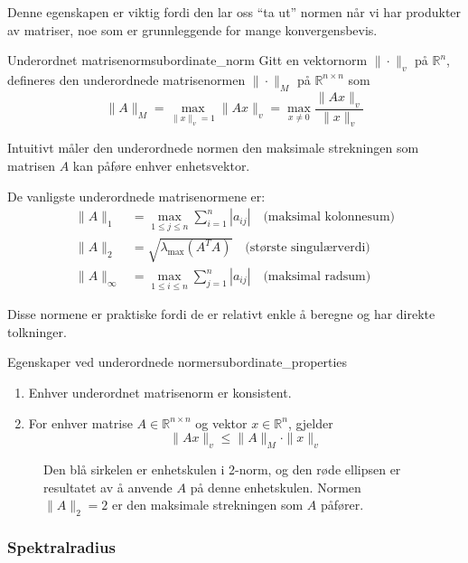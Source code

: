 Denne egenskapen er viktig fordi den lar oss \enquote{ta ut} normen når vi har produkter av matriser, noe som er grunnleggende for mange konvergensbevis.

\begin{definition}{Underordnet matrisenorm}{subordinate_norm}
	Gitt en vektornorm $\|\cdot\|_v$ på $\mathbb{R}^n$, defineres den underordnede matrisenormen $\|\cdot\|_M$ på $\mathbb{R}^{n \times n}$ som
	\[
		\|A\|_M = \max_{\|x\|_v = 1} \|Ax\|_v = \max_{x \neq 0} \frac{\|Ax\|_v}{\|x\|_v}
	\]
\end{definition}

Intuitivt måler den underordnede normen den maksimale strekningen som matrisen $A$ kan påføre enhver enhetsvektor.

De vanligste underordnede matrisenormene er:
\begin{align*}
	\|A\|_1      & = \max_{1 \leq j \leq n} \sum_{i=1}^n |a_{ij}| \quad \text{(maksimal kolonnesum)} \\
	\|A\|_2      & = \sqrt{\lambda_{\max}(A^T A)} \quad \text{(største singulærverdi)}               \\
	\|A\|_\infty & = \max_{1 \leq i \leq n} \sum_{j=1}^n |a_{ij}| \quad \text{(maksimal radsum)}
\end{align*}

Disse normene er praktiske fordi de er relativt enkle å beregne og har direkte tolkninger.

\begin{theorem}{Egenskaper ved underordnede normer}{subordinate_properties}
	\begin{enumerate}
		\item Enhver underordnet matrisenorm er konsistent.
		\item For enhver matrise $A \in \mathbb{R}^{n \times n}$ og vektor $x \in \mathbb{R}^n$, gjelder
		      \[
			      \|Ax\|_v \leq \|A\|_M \cdot \|x\|_v
		      \]
	\end{enumerate}
\end{theorem}

\begin{figure}
	\centering
	
	\caption{Den blå sirkelen er enhetskulen i 2-norm, og den røde ellipsen er resultatet av å anvende $A$ på denne enhetskulen. Normen $\|A\|_2 = 2$ er den maksimale strekningen som $A$ påfører.}
	\label{fig:matrix_norm}
\end{figure}

\subsubsection{Spektralradius}

